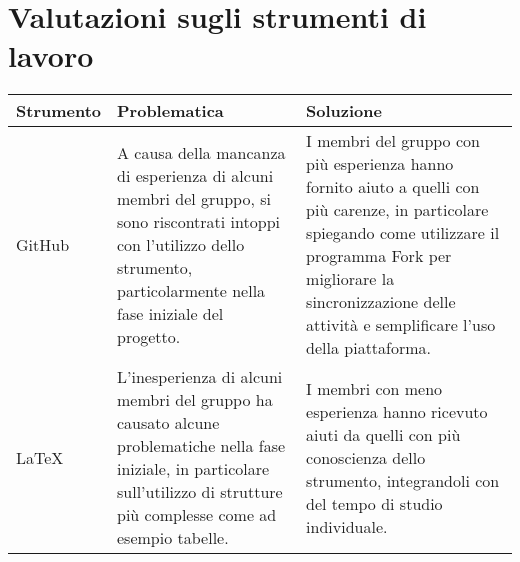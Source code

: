 \section{Valutazioni sugli strumenti di lavoro}

\begin{center}
    \begin{xltabular}{\linewidth}{|l|X|X|}
    \hline
    \textbf{Strumento} & \textbf{Problematica} & \textbf{Soluzione} \\
    \hline
     GitHub & A causa della mancanza di esperienza di alcuni membri del gruppo, si sono riscontrati intoppi con l'utilizzo dello strumento, particolarmente nella fase iniziale del progetto. & I membri del gruppo con più esperienza hanno fornito aiuto a quelli con più carenze, in particolare spiegando come utilizzare il programma Fork per migliorare la sincronizzazione delle attività e semplificare l'uso della piattaforma. \\
     \hline
     LaTeX & L'inesperienza di alcuni membri del gruppo ha causato alcune problematiche nella fase iniziale, in particolare sull'utilizzo di strutture più complesse come ad esempio tabelle. & I membri con meno esperienza hanno ricevuto aiuti da quelli con più conoscienza dello strumento, integrandoli con del tempo di studio individuale. \\
     \hline
    \end{xltabular}
\end{center}